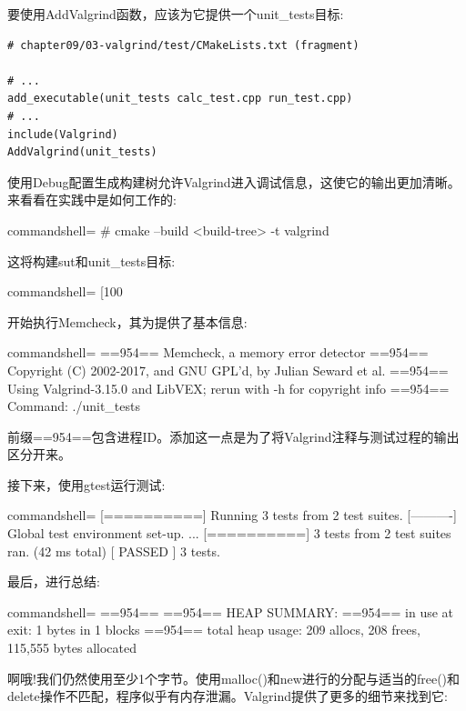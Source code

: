 要使用AddValgrind函数，应该为它提供一个unit\_tests目标:

\begin{lstlisting}[style=styleCMake]
# chapter09/03-valgrind/test/CMakeLists.txt (fragment)

# ...
add_executable(unit_tests calc_test.cpp run_test.cpp)
# ...
include(Valgrind)
AddValgrind(unit_tests)
\end{lstlisting}

使用Debug配置生成构建树允许Valgrind进入调试信息，这使它的输出更加清晰。来看看在实践中是如何工作的:

\begin{tcblisting}{commandshell={}}
# cmake --build <build-tree> -t valgrind
\end{tcblisting}

这将构建sut和unit\_tests目标:

\begin{tcblisting}{commandshell={}}
[100%
\end{tcblisting}

开始执行Memcheck，其为提供了基本信息:

\begin{tcblisting}{commandshell={}}
==954== Memcheck, a memory error detector
==954== Copyright (C) 2002-2017, and GNU GPL'd, by Julian
Seward et al.
==954== Using Valgrind-3.15.0 and LibVEX; rerun with -h for
copyright info
==954== Command: ./unit_tests
\end{tcblisting}

前缀==954==包含进程ID。添加这一点是为了将Valgrind注释与测试过程的输出区分开来。

接下来，使用gtest运行测试:

\begin{tcblisting}{commandshell={}}
[==========] Running 3 tests from 2 test suites.
[----------] Global test environment set-up.
...
[==========] 3 tests from 2 test suites ran. (42 ms total)
[ PASSED ] 3 tests.
\end{tcblisting}

最后，进行总结:

\begin{tcblisting}{commandshell={}}
==954==
==954== HEAP SUMMARY:
==954== in use at exit: 1 bytes in 1 blocks
==954== total heap usage: 209 allocs, 208 frees, 115,555
bytes allocated
\end{tcblisting}

啊哦!我们仍然使用至少1个字节。使用malloc()和new进行的分配与适当的free()和delete操作不匹配，程序似乎有内存泄漏。Valgrind提供了更多的细节来找到它:

